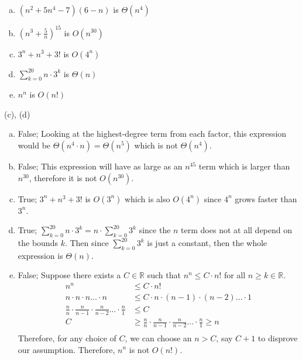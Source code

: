 \newpage
\begin{enumerate}[(a)]
	\item  $(n^2 + 5n^4 - 7)(6 - n)$ is $\Theta (n^4)$
    
	\item  $(n^3 + \frac{5}{n})^{15}$ is $O(n^{30})$
    
	\item  $3^n + n^3 + 3!$ is $O(4^n)$
    
	\item  $\sum\limits_{k=0}^{20} n \cdot 3^k$ is $\Theta(n)$
    
	\item  $n^n$ is $O(n!)$

\end{enumerate}
\begin{solution}

(c), (d)\\
\begin{enumerate}[a)]
    \item False; Looking at the highest-degree term from each factor, this expression would be $\Theta (n^4 \cdot n) = \Theta (n^5)$ which is not $\Theta (n^4)$.
    \item False; This expression will have as large as an $n^{45}$ term which is larger than $n^{30}$, therefore it is not $O(n^{30})$.
    \item True; $3^n + n^3 + 3!$ is $O(3^n)$ which is also $O(4^n)$ since $4^n$ grows faster than $3^n$.
    \item True; $\sum\limits_{k=0}^{20} n \cdot 3^k = n \cdot \sum\limits_{k=0}^{20} 3^k$ since the $n$ term does not at all depend on the bounds $k$. Then since $\sum\limits_{k=0}^{20} 3^k$ is just a constant, then the whole expression is $\Theta(n)$.
    \item False; Suppose there exists a $C \in \mathbb{R}$ such that $n^n \leq C \cdot n!$ for all $n \geq k \in \mathbb{R}$.
    \begin{align*}
        n^n &\leq C \cdot n!\\
        n \cdot n \cdot n \dots \cdot n &\leq C \cdot n \cdot (n - 1) \cdot (n - 2) \dots \cdot 1\\
        \frac{n}{n} \cdot \frac{n}{n - 1} \cdot \frac{n}{n - 2} \dots \cdot \frac{n}{1} &\leq C\\
        C &\geq \frac{n}{n} \cdot \frac{n}{n - 1} \cdot \frac{n}{n - 2} \dots \cdot \frac{n}{1} \geq n\\
    \end{align*}
    Therefore, for any choice of $C$, we can choose an $n > C$, say $C +1$ to disprove our assumption. Therefore, $n^n$ is not $O(n!)$.
\end{enumerate}

\end{solution}


